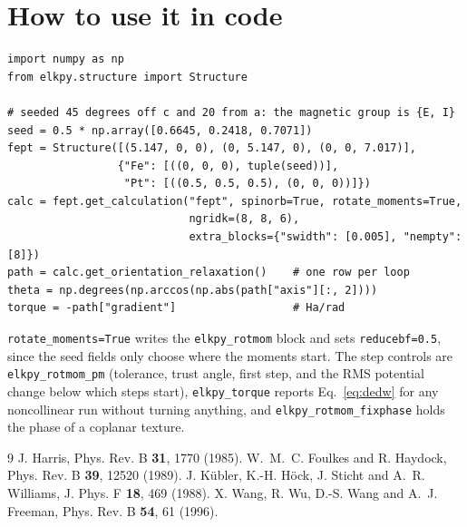 \documentclass[11pt]{article}
\begin{document}
\section{How to use it in code}

\begin{verbatim}
import numpy as np
from elkpy.structure import Structure

# seeded 45 degrees off c and 20 from a: the magnetic group is {E, I}
seed = 0.5 * np.array([0.6645, 0.2418, 0.7071])
fept = Structure([(5.147, 0, 0), (0, 5.147, 0), (0, 0, 7.017)],
                 {"Fe": [((0, 0, 0), tuple(seed))],
                  "Pt": [((0.5, 0.5, 0.5), (0, 0, 0))]})
calc = fept.get_calculation("fept", spinorb=True, rotate_moments=True,
                            ngridk=(8, 8, 6),
                            extra_blocks={"swidth": [0.005], "nempty": [8]})
path = calc.get_orientation_relaxation()    # one row per loop
theta = np.degrees(np.arccos(np.abs(path["axis"][:, 2])))
torque = -path["gradient"]                  # Ha/rad
\end{verbatim}

\texttt{rotate\_moments=True} writes the \texttt{elkpy\_rotmom} block and sets
\texttt{reducebf=0.5}, since the seed fields only choose where the moments
start. The step controls are \texttt{elkpy\_rotmom\_pm}
(tolerance, trust angle, first step, and the RMS potential change below which
steps start), \texttt{elkpy\_torque} reports Eq.~\eqref{eq:dedw} for any
noncollinear run without turning anything, and
\texttt{elkpy\_rotmom\_fixphase} holds the phase of a coplanar texture.

\begin{thebibliography}{9}
 J. Harris, Phys. Rev. B \textbf{31}, 1770 (1985).
 W.~M.~C. Foulkes and R. Haydock, Phys. Rev. B
  \textbf{39}, 12520 (1989).
 J. K\"ubler, K.-H. H\"ock, J. Sticht and A.~R. Williams,
  J. Phys. F \textbf{18}, 469 (1988).
 X. Wang, R. Wu, D.-S. Wang and A.~J. Freeman, Phys. Rev. B
  \textbf{54}, 61 (1996).
\end{thebibliography}
\end{document}
